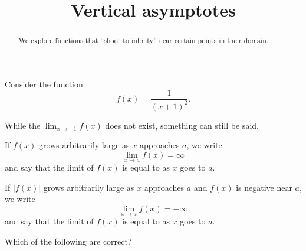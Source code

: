 \documentclass{ximera}
\title[Dig-In:]{Vertical asymptotes}
\begin{document}
\begin{abstract}
We explore functions that ``shoot to infinity'' near certain points in
their domain.
\end{abstract}
\maketitle

Consider the function
\[
f(x) = \frac{1}{(x+1)^2}.
\]
\begin{image}
\end{image}
While the $\lim_{x\to -1} f(x)$ does not exist, something can still be
said.

\begin{definition}\label{def:inflimit}
If $f(x)$ grows arbitrarily large as $x$ approaches $a$, we write
\[
\lim_{x\to a} f(x) = \infty
\]
and say that the limit of $f(x)$ is equal to  as $x$
goes to $a$.

If $|f(x)|$ grows arbitrarily large as $x$ approaches $a$ and $f(x)$ is
negative near $a$, we write
\[
\lim_{x\to a} f(x) = -\infty
\]
and say that the limit of $f(x)$ is equal to 
as $x$ goes to $a$.
\end{definition}

\begin{question}
  Which of the following are correct?
  \begin{selectAll}
  \end{selectAll}
\end{question}
\end{document}
